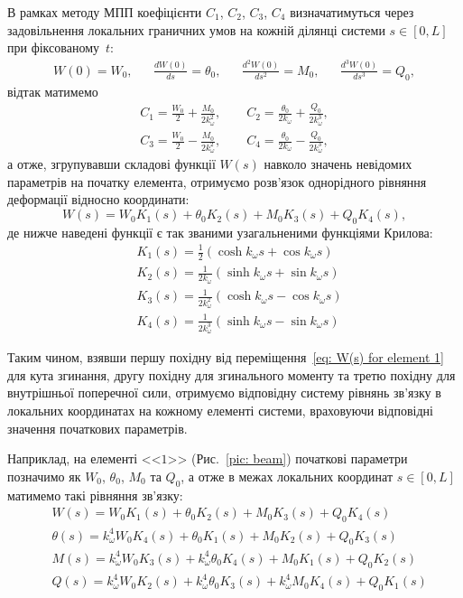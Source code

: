 В рамках методу МПП коефіцієнти $C_1$, $C_2$, $C_3$, $C_4$ визначатимуться через задовільнення локальних граничних умов на кожній ділянці системи $s \in [0,L]$ при фіксованому~$t:$ 
\begin{align}\label{eq: TMM initial conditions, element 1}
    W(0)=W_0, && \frac{dW(0)}{ds}=\theta_0, && \frac{d^2W(0)}{ds^2}=M_0, && \frac{d^3W(0)}{ds^3}=Q_0,
\end{align}
відтак матимемо
\begin{align}\label{eq: A1, A2, A3, A4 for element 1}
    C_1=\frac{W_0}{2} + \frac{M_0}{2k_{\omega}^2}, 
    \qquad C_2=\frac{\theta_0}{2k_{\omega}} + \frac{Q_0}{2k_{\omega}^3}, \\
    C_3=\frac{W_0}{2} - \frac{M_0}{2k_{\omega}^2},
    \qquad C_4=\frac{\theta_0}{2k_{\omega}} - \frac{Q_0}{2k_{\omega}^3},
\end{align}
а отже, згрупувавши складові функції $W(s)$ навколо значень невідомих параметрів на початку елемента, отримуємо розв'язок однорідного рівняння деформації відносно координати:
\begin{equation}\label{eq: W(s) for element 1}
    W(s) = W_0 K_1(s) + \theta_0 K_2(s) + M_0 K_3(s) + Q_0 K_4(s),
\end{equation}
де нижче наведені функції є так званими узагальненими функціями Крилова:
\begin{align}\label{eq: Krylov for element 1}
    & K_1(s) = \tfrac{1}{2} (\cosh{k_{\omega} s} + \cos{k_{\omega} s}) \\
    & K_2(s) = \tfrac{1}{2k_{\omega}} (\sinh{k_{\omega} s} + \sin{k_{\omega} s}) \\
    & K_3(s) = \tfrac{1}{2k_{\omega}^2} (\cosh{k_{\omega} s} - \cos{k_{\omega} s}) \\
    & K_4(s) = \tfrac{1}{2k_{\omega}^3} (\sinh{k_{\omega} s} - \sin{k_{\omega} s})
\end{align}

Таким чином, взявши першу похідну від переміщення~\eqref{eq: W(s) for element 1} для кута згинання, другу похідну для згинального моменту та третю похідну для внутрішньої поперечної сили, отримуємо відповідну систему рівнянь зв'язку в локальних координатах на кожному елементі системи, враховуючи відповідні значення початкових параметрів.

Наприклад, на елементі <<$1$>> (Рис.~\ref{pic: beam}) початкові параметри позначимо як $W_0$, $\theta_0$, $M_0$ та $Q_0$, а отже в межах локальних координат $s \in [0,L]$ матимемо такі рівняння зв'язку:
\begin{align}\label{eq: field equations for element 1}
    & W(s) = W_0 K_1(s) + \theta_0 K_2(s) + M_0 K_3(s) + Q_0 K_4(s) \\
    & \theta(s) = k_{\omega}^4 W_0 K_4(s) + \theta_0 K_1(s) + M_0 K_2(s) + Q_0 K_3(s) \\
    & M(s) = k_{\omega}^4 W_0 K_3(s) + k_{\omega}^4 \theta_0 K_4(s) + M_0 K_1(s) + Q_0 K_2(s) \\
    & Q(s) = k_{\omega}^4 W_0 K_2(s) + k_{\omega}^4 \theta_0 K_3(s) + k_{\omega}^4 M_0 K_4(s) + Q_0 K_1(s)
\end{align}

